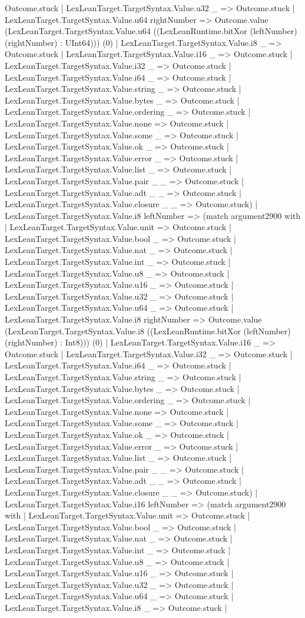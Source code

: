 \documentclass[11pt]{article}
\begin{document}
Outcome.stuck | LexLeanTarget.TargetSyntax.Value.u32 \_ => Outcome.stuck | LexLeanTarget.TargetSyntax.Value.u64 rightNumber => Outcome.value (LexLeanTarget.TargetSyntax.Value.u64 ((LexLeanRuntime.bitXor (leftNumber) (rightNumber) : UInt64))) (0) | LexLeanTarget.TargetSyntax.Value.i8 \_ => Outcome.stuck | LexLeanTarget.TargetSyntax.Value.i16 \_ => Outcome.stuck | LexLeanTarget.TargetSyntax.Value.i32 \_ => Outcome.stuck | LexLeanTarget.TargetSyntax.Value.i64 \_ => Outcome.stuck | LexLeanTarget.TargetSyntax.Value.string \_ => Outcome.stuck | LexLeanTarget.TargetSyntax.Value.bytes \_ => Outcome.stuck | LexLeanTarget.TargetSyntax.Value.ordering \_ => Outcome.stuck | LexLeanTarget.TargetSyntax.Value.none => Outcome.stuck | LexLeanTarget.TargetSyntax.Value.some \_ => Outcome.stuck | LexLeanTarget.TargetSyntax.Value.ok \_ => Outcome.stuck | LexLeanTarget.TargetSyntax.Value.error \_ => Outcome.stuck | LexLeanTarget.TargetSyntax.Value.list \_ => Outcome.stuck | LexLeanTarget.TargetSyntax.Value.pair \_ \_ => Outcome.stuck | LexLeanTarget.TargetSyntax.Value.adt \_ \_ => Outcome.stuck | LexLeanTarget.TargetSyntax.Value.closure \_ \_ => Outcome.stuck) | LexLeanTarget.TargetSyntax.Value.i8 leftNumber => (match argument2900 with | LexLeanTarget.TargetSyntax.Value.unit => Outcome.stuck | LexLeanTarget.TargetSyntax.Value.bool \_ => Outcome.stuck | LexLeanTarget.TargetSyntax.Value.nat \_ => Outcome.stuck | LexLeanTarget.TargetSyntax.Value.int \_ => Outcome.stuck | LexLeanTarget.TargetSyntax.Value.u8 \_ => Outcome.stuck | LexLeanTarget.TargetSyntax.Value.u16 \_ => Outcome.stuck | LexLeanTarget.TargetSyntax.Value.u32 \_ => Outcome.stuck | LexLeanTarget.TargetSyntax.Value.u64 \_ => Outcome.stuck | LexLeanTarget.TargetSyntax.Value.i8 rightNumber => Outcome.value (LexLeanTarget.TargetSyntax.Value.i8 ((LexLeanRuntime.bitXor (leftNumber) (rightNumber) : Int8))) (0) | LexLeanTarget.TargetSyntax.Value.i16 \_ => Outcome.stuck | LexLeanTarget.TargetSyntax.Value.i32 \_ => Outcome.stuck | LexLeanTarget.TargetSyntax.Value.i64 \_ => Outcome.stuck | LexLeanTarget.TargetSyntax.Value.string \_ => Outcome.stuck | LexLeanTarget.TargetSyntax.Value.bytes \_ => Outcome.stuck | LexLeanTarget.TargetSyntax.Value.ordering \_ => Outcome.stuck | LexLeanTarget.TargetSyntax.Value.none => Outcome.stuck | LexLeanTarget.TargetSyntax.Value.some \_ => Outcome.stuck | LexLeanTarget.TargetSyntax.Value.ok \_ => Outcome.stuck | LexLeanTarget.TargetSyntax.Value.error \_ => Outcome.stuck | LexLeanTarget.TargetSyntax.Value.list \_ => Outcome.stuck | LexLeanTarget.TargetSyntax.Value.pair \_ \_ => Outcome.stuck | LexLeanTarget.TargetSyntax.Value.adt \_ \_ => Outcome.stuck | LexLeanTarget.TargetSyntax.Value.closure \_ \_ => Outcome.stuck) | LexLeanTarget.TargetSyntax.Value.i16 leftNumber => (match argument2900 with | LexLeanTarget.TargetSyntax.Value.unit => Outcome.stuck | LexLeanTarget.TargetSyntax.Value.bool \_ => Outcome.stuck | LexLeanTarget.TargetSyntax.Value.nat \_ => Outcome.stuck | LexLeanTarget.TargetSyntax.Value.int \_ => Outcome.stuck | LexLeanTarget.TargetSyntax.Value.u8 \_ => Outcome.stuck | LexLeanTarget.TargetSyntax.Value.u16 \_ => Outcome.stuck | LexLeanTarget.TargetSyntax.Value.u32 \_ => Outcome.stuck | LexLeanTarget.TargetSyntax.Value.u64 \_ => Outcome.stuck | LexLeanTarget.TargetSyntax.Value.i8 \_ => Outcome.stuck | 
\end{document}
